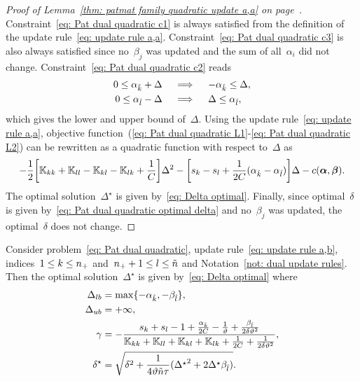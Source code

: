 \begin{proof}[Proof of Lemma~\ref{thm: patmat family quadratic update a,a} on page~\pageref{thm: patmat family quadratic update a,a}]
  Constraint~\eqref{eq: Pat dual quadratic c1} is always satisfied from the definition of the update rule~\eqref{eq: update rule a,a}. Constraint~\eqref{eq: Pat dual quadratic c3} is also always satisfied since no~$\beta_j$ was updated and the sum of all~$\alpha_i$ did not change. Constraint~\eqref{eq: Pat dual quadratic c2} reads
  \begin{align*}
    0 \leq \alpha_{\hat{k}} + \Delta
    & \quad \implies \quad
    - \alpha_{\hat{k}} \leq \Delta, \\
    0 \leq \alpha_{\hat{l}} - \Delta
    & \quad \implies \quad
    \Delta \leq \alpha_{\hat{l}},
  \end{align*}
  which gives the lower and upper bound of~$\Delta.$ Using the update rule~\eqref{eq: update rule a,a}, objective function~(\ref{eq: Pat dual quadratic L1}-\ref{eq: Pat dual quadratic L2}) can be rewritten as a quadratic function with respect to~$\Delta$ as
  \begin{equation*}
    - \frac{1}{2} \Brac[s]{\K_{kk} + \K_{ll} - \K_{kl} - \K_{lk} + \frac{1}{C}} \Delta^2
    - \Brac[s]{s_k - s_l + \frac{1}{2C}(\alphak - \alphal)} \Delta
    - c(\bm{\alpha}, \bm{\beta}).
  \end{equation*}
  The optimal solution~$\Delta^{\star}$ is given by~\eqref{eq: Delta optimal}. Finally, since optimal~$\delta$ is given by~\eqref{eq: Pat dual quadratic optimal delta} and no~$\beta_j$ was updated, the optimal~$\delta$ does not change.
\end{proof}

\begin{lemma}\label{thm: patmat family quadratic update a,b}
  Consider problem~\eqref{eq: Pat dual quadratic}, update rule~\eqref{eq: update rule a,b}, indices~$1 \leq k \leq n_{+}$ and~$n_{+} + 1 \leq l \leq \tilde{n}$ and Notation~\ref{not: dual update rules}. Then the optimal solution~$\Delta^{\star}$ is given by~\eqref{eq: Delta optimal} where
  \begin{align*}
    \Delta_{lb} & = \max\{- \alpha_{\hat{k}}, - \beta_{\hat{l}}\}, \\
    \Delta_{ub} & = +\infty, \\
    \gamma      & = -\frac{s_k + s_l  - 1 + \frac{\alpha_{\hat{k}}}{2C} - \frac{1}{\vartheta} + \frac{\beta_{\hat{l}}}{2 \delta \vartheta^2}}{\mathbb{K}_{kk} + \mathbb{K}_{ll} + \mathbb{K}_{kl} + \mathbb{K}_{lk} + \frac{1}{2C} + \frac{1}{2 \delta \vartheta^2}}, \\
    \delta^{\star}  & = \sqrt{\delta^2 + \frac{1}{4 \vartheta \tilde{n} \tau}({\Delta^{\star}}^2 + 2 \Delta^{\star} \beta_{\hat{l}})}.
  \end{align*}
\end{lemma}

